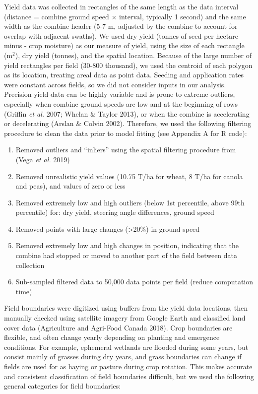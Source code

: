 \documentclass[]{elsarticle} %
\providecommand{\tightlist}{%
  \setlength{\itemsep}{0pt}\setlength{\parskip}{0pt}}
\begin{document}
Yield data was collected in rectangles of the same length as the data interval (distance = combine ground speed \(\times\) interval, typically 1 second) and the same width as the combine header (5-7 m, adjusted by the combine to account for overlap with adjacent swaths).
We used dry yield (tonnes of seed per hectare minus - crop moisture) as our measure of yield, using the size of each rectangle (m\(^2\)), dry yield (tonnes), and the spatial location.
Because of the large number of yield rectangles per field (30-800 thousand), we used the centroid of each polygon as its location, treating areal data as point data.
Seeding and application rates were constant across fields, so we did not consider inputs in our analysis.
Precision yield data can be highly variable and is prone to extreme outliers, especially when combine ground speeds are low and at the beginning of rows (Griffin \emph{et al.} 2007; Whelan \& Taylor 2013), or when the combine is accelerating or decelerating (Arslan \& Colvin 2002).
Therefore, we used the following filtering procedure to clean the data prior to model fitting (see Appendix A for R code):

\begin{enumerate}
\def\labelenumi{\arabic{enumi}.}
\tightlist
\item
  Removed outliers and ``inliers'' using the spatial filtering procedure from (Vega \emph{et al.} 2019)
\item
  Removed unrealistic yield values (10.75 T/ha for wheat, 8 T/ha for canola and peas), and values of zero or less
\item
  Removed extremely low and high outliers (below 1st percentile, above 99th percentile) for: dry yield, steering angle differences, ground speed
\item
  Removed points with large changes (\textgreater20\%) in ground speed
\item
  Removed extremely low and high changes in position, indicating that the combine had stopped or moved to another part of the field between data collection
\item
  Sub-sampled filtered data to 50,000 data points per field (reduce computation time)
\end{enumerate}

Field boundaries were digitized using buffers from the yield data locations, then manually checked using satellite imagery from Google Earth and classified land cover data (Agriculture and Agri-Food Canada 2018).
Crop boundaries are flexible, and often change yearly depending on planting and emergence conditions.
For example, ephemeral wetlands are flooded during some years, but consist mainly of grasses during dry years, and grass boundaries can change if fields are used for as haying or pasture during crop rotation.
This makes accurate and consistent classification of field boundaries difficult, but we used the following general categories for field boundaries:
\end{document}
